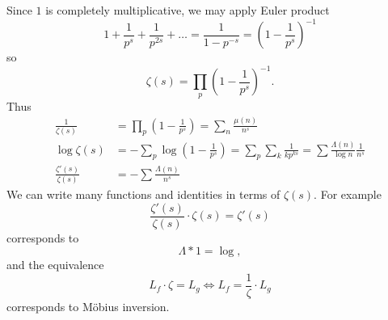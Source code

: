 \documentclass[a4paper]{article}
\begin{document}
Since \(1\) is completely multiplicative, we may apply Euler product
\[
  1 + \frac{1}{p^s} + \frac{1}{p^{2s}} + \dots = \frac{1}{1 - p^{-s}} = \left( 1 - \frac{1}{p^s} \right)^{-1}
\]
so
\[
  \zeta(s) = \prod_p \left( 1 - \frac{1}{p^s} \right)^{-1}.
\]
Thus
\begin{align*}
  \frac{1}{\zeta(s)} &= \prod_p \left( 1 - \frac{1}{p^s} \right) = \sum_n \frac{\mu(n)}{n^s} \\
  \log \zeta(s) &= - \sum_p \log (1 - \frac{1}{p^s}) = \sum_p\sum_k \frac{1}{k p^{ks}} = \sum \frac{\Lambda(n)}{\log n} \frac{1}{n^s} \\
  \frac{\zeta'(s)}{\zeta(s)} &= - \sum \frac{\Lambda(n)}{n^s}
\end{align*}
We can write many functions and identities in terms of \(\zeta(s)\). For example
\[
  \frac{\zeta'(s)}{\zeta(s)} \cdot \zeta(s) = \zeta'(s)
\]
corresponds to
\[
  \Lambda * 1 = \log,
\]
and the equivalence
\[
  L_f \cdot \zeta = L_g \iff L_f = \frac{1}{\zeta} \cdot L_g
\]
corresponds to Möbius inversion.












\printindex
\end{document}
